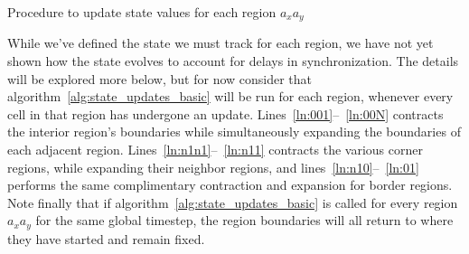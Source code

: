 \begin{algorithm}[h]
  \setcounter{AlgoLine}{0}
  \caption{Procedure to update state values for each region $a_xa_y$}
  \label{alg:state_updates_basic}
\end{algorithm}

  While we've defined the state we must track for each region,
we have not yet shown how the state evolves to account for delays in synchronization.
The details will be explored more
  below, but for now consider that algorithm~\ref{alg:state_updates_basic} will
 be run for each region, whenever every cell in that region has
 undergone an update. Lines~\ref{ln:001}--~\ref{ln:00N} contracts the interior region's
 boundaries
 while simultaneously expanding the boundaries of each adjacent region.
 Lines~\ref{ln:n1n1}--~\ref{ln:n11}
 contracts the various corner regions, while expanding their neighbor
 regions, and lines~\ref{ln:n10}--~\ref{ln:01} performs the same
 complimentary contraction and expansion for border regions.
 Note finally that if algorithm~\ref{alg:state_updates_basic} is called
 for every region $a_xa_y$ for the same global timestep, the region boundaries
 will all return to where they have started and remain
 fixed.

